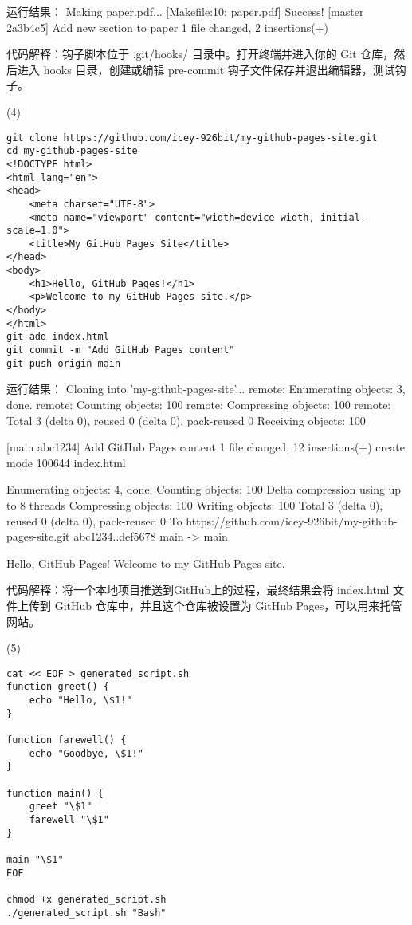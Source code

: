 \documentclass[a4paper, 12pt]{article}
\begin{document}
{\color{blue}
运行结果：
Making paper.pdf...
[Makefile:10: paper.pdf] Success!
[master 2a3b4c5] Add new section to paper
 1 file changed, 2 insertions(+)
}

代码解释：钩子脚本位于 .git/hooks/ 目录中。打开终端并进入你的 Git 仓库，然后进入 hooks 目录，创建或编辑 pre-commit 钩子文件保存并退出编辑器，测试钩子。

(4)
\begin{verbatim}
git clone https://github.com/icey-926bit/my-github-pages-site.git
cd my-github-pages-site
<!DOCTYPE html>
<html lang="en">
<head>
    <meta charset="UTF-8">
    <meta name="viewport" content="width=device-width, initial-scale=1.0">
    <title>My GitHub Pages Site</title>
</head>
<body>
    <h1>Hello, GitHub Pages!</h1>
    <p>Welcome to my GitHub Pages site.</p>
</body>
</html>
git add index.html
git commit -m "Add GitHub Pages content"
git push origin main
\end{verbatim}

{\color{blue}
运行结果：
Cloning into 'my-github-pages-site'...
remote: Enumerating objects: 3, done.
remote: Counting objects: 100%
remote: Compressing objects: 100%
remote: Total 3 (delta 0), reused 0 (delta 0), pack-reused 0
Receiving objects: 100%

[main abc1234] Add GitHub Pages content
 1 file changed, 12 insertions(+)
 create mode 100644 index.html

Enumerating objects: 4, done.
Counting objects: 100%
Delta compression using up to 8 threads
Compressing objects: 100%
Writing objects: 100%
Total 3 (delta 0), reused 0 (delta 0), pack-reused 0
To https://github.com/icey-926bit/my-github-pages-site.git
   abc1234..def5678  main -> main

Hello, GitHub Pages!
Welcome to my GitHub Pages site.
}

代码解释：将一个本地项目推送到GitHub上的过程，最终结果会将 index.html 文件上传到 GitHub 仓库中，并且这个仓库被设置为 GitHub Pages，可以用来托管网站。

(5)
\begin{verbatim}
cat << EOF > generated_script.sh
function greet() {
    echo "Hello, \$1!"
}

function farewell() {
    echo "Goodbye, \$1!"
}

function main() {
    greet "\$1"
    farewell "\$1"
}

main "\$1"
EOF

chmod +x generated_script.sh
./generated_script.sh "Bash"
\end{verbatim}
\end{document}
